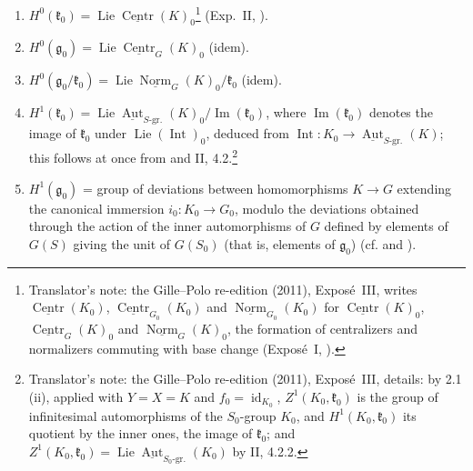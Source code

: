 \begin{enumerate}
\item[a)]
\(H^0(\mathfrak k_0)
=\operatorname{Lie}\underline{\operatorname{Centr}}(K)_0\)\footnote{Translator's note: the Gille--Polo re-edition (2011), Exposé~III, writes
\(\underline{\operatorname{Centr}}(K_0)\),
\(\underline{\operatorname{Centr}}_{G_0}(K_0)\) and
\(\underline{\operatorname{Norm}}_{G_0}(K_0)\) for
\(\underline{\operatorname{Centr}}(K)_0\),
\(\underline{\operatorname{Centr}}_G(K)_0\) and
\(\underline{\operatorname{Norm}}_G(K)_0\), the formation of centralizers and
normalizers commuting with base change (Exposé~I, ).}
(Exp.~II, ).

\item[b)]
\(H^0(\mathfrak g_0)
=\operatorname{Lie}\underline{\operatorname{Centr}}_G(K)_0\)
(idem).

\item[c)]
\(H^0(\mathfrak g_0/\mathfrak k_0)
=\operatorname{Lie}\underline{\operatorname{Norm}}_G(K)_0/\mathfrak k_0\)
(idem).

\item[d)]
\(H^1(\mathfrak k_0)
=\operatorname{Lie}\underline{\operatorname{Aut}}_{S\text{-gr.}}(K)_0
/\operatorname{Im}(\mathfrak k_0)\),
where \(\operatorname{Im}(\mathfrak k_0)\) denotes the image of
\(\mathfrak k_0\) under \(\operatorname{Lie}(\operatorname{Int})_0\),
deduced from
\(\operatorname{Int}:K_0\to\underline{\operatorname{Aut}}_{S\text{-gr.}}(K)\);
this follows at once from  and II, 4.2.\footnote{Translator's note: the Gille--Polo re-edition (2011), Exposé~III,
details: by 2.1 (ii), applied with \(Y=X=K\) and \(f_0=\operatorname{id}_{K_0}\),
\(Z^1(K_0,\mathfrak k_0)\) is the group of infinitesimal automorphisms of the
\(S_0\)-group \(K_0\), and \(H^1(K_0,\mathfrak k_0)\) its quotient by the inner
ones, the image of \(\mathfrak k_0\); and
\(Z^1(K_0,\mathfrak k_0)=\operatorname{Lie}\underline{\operatorname{Aut}}_{S_0\text{-gr.}}
(K_0)\) by II, 4.2.2.}

\item[e)]
\(H^1(\mathfrak g_0)\) = group of deviations between homomorphisms
\(K\to G\) extending the canonical immersion \(i_0:K_0\to G_0\), modulo
the deviations obtained through the action of the inner automorphisms of
\(G\) defined by elements of \(G(S)\) giving the unit of \(G(S_0)\) (that
is, elements of \(\mathfrak g_0\)) (cf.  and ).


\end{enumerate}
